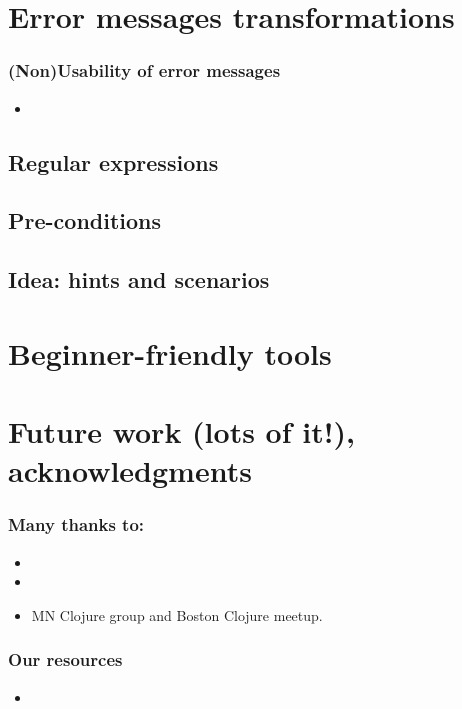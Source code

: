 \documentclass{beamer}
\begin{document}
\section{Error messages transformations}

\begin{frame}
   \frametitle{(Non)Usability of error messages}
\begin{itemize}
\item 
\end{itemize}
\end{frame}


\subsection{Regular expressions}

\subsection{Pre-conditions}

\subsection{Idea: hints and scenarios}

\section{Beginner-friendly tools}

\section{Future work (lots of it!), acknowledgments}

\begin{frame}
   \frametitle{Many thanks to:}
\begin{itemize}
\item 
\item 
\item MN Clojure group and Boston Clojure meetup. 
\end{itemize}
\end{frame}

\begin{frame}
   \frametitle{Our resources}
\begin{itemize}
\item 
\end{itemize}
\end{frame}
\end{document}
